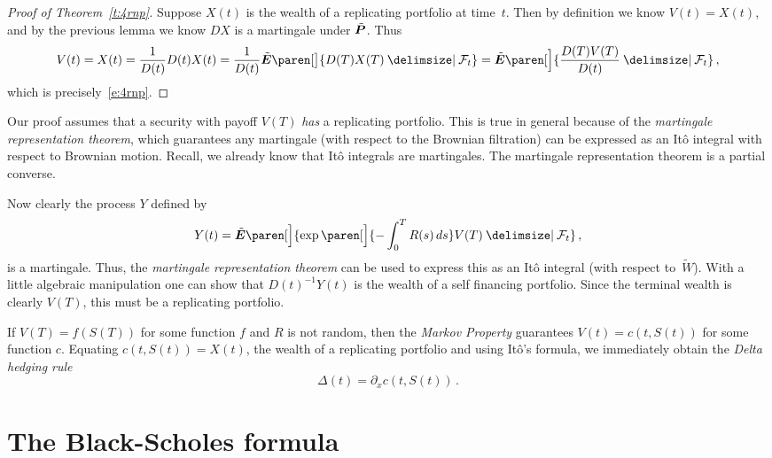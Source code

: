 \begin{proof}[Proof of Theorem~\ref{t:4rnp}]
  Suppose $X(t)$ is the wealth of a replicating portfolio at time~$t$.
  Then by definition we know $V(t) = X(t)$, and by the previous lemma we know $DX$ is a martingale under $\tilde\P$.
  Thus
  \begin{equation*}
    V(t)
      = X(t)
      = \frac{1}{D(t)} D(t) X(t)
      = \frac{1}{D(t)} \tilde\E\paren[\big]{ D(T) X(T) \given \mathcal F_t }
      = \tilde\E\paren[\Big]{
	  \frac{D(T) V(T)}{D(t)} \given \mathcal F_t }\,,
  \end{equation*}
  which is precisely~\eqref{e:4rnp}.
\end{proof}
\begin{remark}
  Our proof assumes that a security with payoff $V(T)$ \emph{has} a replicating portfolio.
  This is true in general because of the \emph{martingale representation theorem}, which guarantees any martingale (with respect to the Brownian filtration) can be expressed as an It\^o integral with respect to Brownian motion.
  Recall, we already know that It\^o integrals are martingales.
  The martingale representation theorem is a partial converse.

  Now clearly the process $Y$ defined by
  \begin{equation*}
    Y(t) = \tilde\E \paren[\Big]{\exp\paren[\Big]{-\int_0^T R(s) \, ds} V(T) \given \mathcal F_t }\,,
  \end{equation*}
  is a martingale.
  Thus, the \emph{martingale representation theorem} can be used to express this as an It\^o integral (with respect to~$\tilde W$).
  With a little algebraic manipulation one can show that $D(t)^{-1} Y(t)$ is the wealth of a self financing portfolio.
  Since the terminal wealth is clearly $V(T)$, this must be a replicating portfolio.
\end{remark}
\begin{remark}
  If $V(T) = f(S(T))$ for some function $f$ and $R$ is not random, then the \emph{Markov Property} guarantees $V(t) = c(t, S(t))$ for some function $c$.
  Equating $c(t, S(t)) = X(t)$, the wealth of a replicating portfolio and using It\^o's formula, we immediately obtain the \emph{Delta hedging rule}
  \begin{equation*}
    \Delta(t) = \partial_x c(t, S(t))\,.
  \end{equation*}
\end{remark}
\section{The Black-Scholes formula}

